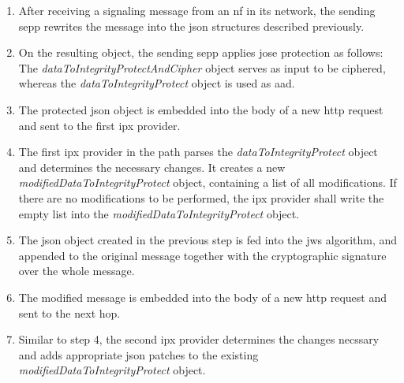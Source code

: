\begin{enumerate}[wide, labelwidth=!, labelindent=0pt]
    \item After receiving a signaling message from an \gls{nf} in its network, the sending \gls{sepp} rewrites the message into the \gls{json} structures described previously.
    \item On the resulting object, the sending \gls{sepp} applies \gls{jose} protection as follows: The \textit{dataToIntegrityProtectAndCipher} object serves as input to be ciphered, whereas the \textit{dataToIntegrityProtect} object is used as \gls{aad}.
    \item The protected \gls{json} object is embedded into the body of a new \gls{http} request and sent to the first \gls{ipx} provider.
    \item The first \gls{ipx} provider in the path parses the \textit{dataToIntegrityProtect} object and determines the necessary changes. It creates a new \textit{modifiedDataToIntegrityProtect} object, containing a list of all modifications. If there are no modifications to be performed, the \gls{ipx} provider shall write the empty list into the \textit{modifiedDataToIntegrityProtect} object.
    \item The \gls{json} object created in the previous step is fed into the \gls{jws} algorithm, and appended to the original message together with the cryptographic signature over the whole message.
    \item The modified message is embedded into the body of a new \gls{http} request and sent to the next hop.
    \item Similar to step 4, the second \gls{ipx} provider determines the changes necssary and adds appropriate \gls{json} patches to the existing \textit{modifiedDataToIntegrityProtect} object.

\end{enumerate}
